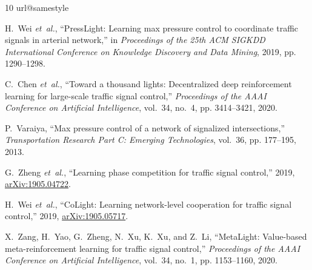 \documentclass[letterpaper,journal]{IEEEtran}
\begin{document}
\begin{thebibliography}{10}
\providecommand{\url}[1]{#1}
\csname url@samestyle\endcsname
\providecommand{\newblock}{\relax}
\providecommand{\bibinfo}[2]{#2}
\providecommand{\BIBentrySTDinterwordspacing}{\spaceskip=0pt\relax}
\providecommand{\BIBentryALTinterwordstretchfactor}{4}
\providecommand{\BIBentryALTinterwordspacing}{\spaceskip=\fontdimen2\font plus
\BIBentryALTinterwordstretchfactor\fontdimen3\font minus
  \fontdimen4\font\relax}
\providecommand{\BIBforeignlanguage}[2]{{%
\expandafter\ifx\csname l@#1\endcsname\relax
\typeout{** WARNING: IEEEtran.bst: No hyphenation pattern has been}%
\typeout{** loaded for the language `#1'. Using the pattern for}%
\typeout{** the default language instead.}%
\else
\language=\csname l@#1\endcsname
\fi
#2}}
\providecommand{\BIBdecl}{\relax}
\BIBdecl

H.~Wei \emph{et~al.}, ``{PressLight}:
  Learning max pressure control to coordinate traffic signals in arterial
  network,'' in \emph{Proceedings of the 25th ACM SIGKDD International
  Conference on Knowledge Discovery and Data Mining}, 2019, pp. 1290--1298.

C.~Chen \emph{et~al.}, ``Toward
  a thousand lights: Decentralized deep reinforcement learning for large-scale
  traffic signal control,'' \emph{Proceedings of the AAAI Conference on
  Artificial Intelligence}, vol.~34, no.~4, pp. 3414--3421, 2020.

P.~Varaiya, ``Max pressure control of a network of signalized intersections,''
  \emph{Transportation Research Part C: Emerging Technologies}, vol.~36, pp.
  177--195, 2013.

G.~Zheng \emph{et~al.}, ``Learning phase competition for traffic signal control,''
  2019, \href{https://arxiv.org/abs/1905.04722}{arXiv:1905.04722}.

H.~Wei \emph{et~al.}, ``{CoLight}: Learning network-level cooperation for traffic signal control,''
  2019, \href{https://arxiv.org/abs/1905.05717}{arXiv:1905.05717}.

X.~Zang, H.~Yao, G.~Zheng, N.~Xu, K.~Xu, and Z.~Li, ``{MetaLight}: Value-based
  meta-reinforcement learning for traffic signal control,'' \emph{Proceedings
  of the AAAI Conference on Artificial Intelligence}, vol.~34, no.~1, pp.
  1153--1160, 2020.


\end{thebibliography}
\end{document}
